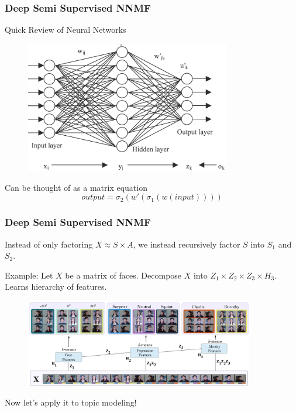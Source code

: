 \documentclass{beamer}
\begin{document}
						\begin{frame}
							\frametitle{Deep Semi Supervised NNMF}
							Quick Review of Neural Networks
	\begin{figure}
		\centering
			\includegraphics[width=9cm]{NeuralNetwork}
	\end{figure}

	
	Can be thought of as a matrix equation
	\begin{equation*}
	output = \sigma_2 (w'(\sigma_1(w(input)))) 
	\end{equation*}
						\end{frame}
							\begin{frame}
								\frametitle{Deep Semi Supervised NNMF}
								Instead of only factoring $X \approx S \times A$, we instead recursively factor $S$ into $S_1$ and $S_2$.
								
								Example: Let $X$ be a matrix of faces. Decompose $X$ into $Z_1 \times Z_2 \times Z_3 \times H_3$. Learns hierarchy of features.
								\begin{figure}
									\centering
										\includegraphics[width=10cm]{dsnnmf}
								\end{figure}
									Now let's apply it to topic modeling!
							\end{frame}
\end{document}
